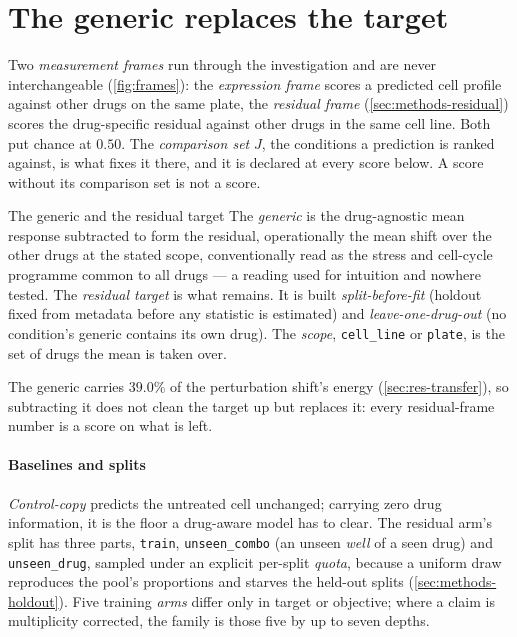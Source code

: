\section{The generic replaces the target}
\label{sec:apparatus-vocab}

Two \emph{measurement frames} run through the investigation and are never
interchangeable (\cref{fig:frames}): the \emph{expression frame} scores a
predicted cell profile against other drugs on the same plate, the
\emph{residual frame} (\cref{sec:methods-residual}) scores the drug-specific
residual against other drugs in the same cell line. Both put chance at $0.50$. The
\emph{comparison set} $J$, the conditions a prediction is ranked against, is
what fixes it there, and it is declared at every score below. A score without
its comparison set is not a score.



\begin{defn}{The generic and the residual target}
The \emph{generic} is the drug-agnostic mean response subtracted to form the
residual, operationally the mean shift over the other drugs at the stated scope,
conventionally read as the stress and cell-cycle programme common to all
drugs --- a reading used for intuition and nowhere tested. The
\emph{residual target} is what remains. It is built \emph{split-before-fit}
(holdout fixed from metadata before any statistic is estimated) and
\emph{leave-one-drug-out} (no condition's generic contains its own drug). The \emph{scope}, \texttt{cell\_line} or \texttt{plate}, is the set
of drugs the mean is taken over.
\end{defn}

The generic carries $39.0\%$ of the perturbation shift's energy
(\cref{sec:res-transfer}), so subtracting it does not clean the target up but
replaces it: every residual-frame number is a score on what is left.

\paragraph{Baselines and splits} \emph{Control-copy} predicts the untreated cell
unchanged; carrying zero drug information, it is the floor a drug-aware model
has to clear. The residual arm's split has three parts,
\texttt{train}, \texttt{unseen\_combo} (an unseen \emph{well} of a seen drug)
and \texttt{unseen\_drug}, sampled under an explicit per-split \emph{quota},
because a uniform draw reproduces the pool's proportions and starves the
held-out splits (\cref{sec:methods-holdout}). Five training \emph{arms} differ
only in target or objective; where a claim is multiplicity corrected, the family
is those five by up to seven depths.

